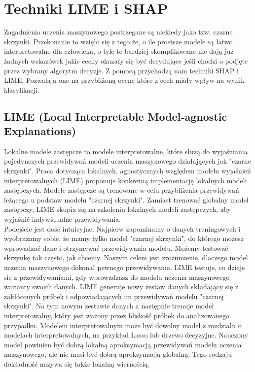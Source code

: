 \section{Techniki LIME i SHAP}
Zagadnienia uczenia maszynowego postrzegane są niekiedy jako tzw. czarne skrzynki. Przekonanie to wzięło się z tego że, o ile prostsze modele są łatwo interpretowalne dla człowieka, o tyle te bardziej skomplikowane nie dają już żadnych wskazówek jakie cechy okazały się być decydujące jeśli chodzi o podjęte przez wybrany algorytm decyzje. Z pomocą przychodzą nam techniki SHAP i LIME. Pozwalaja one na przybliżoną ocenę które z cech miały wpływ na wynik klasyfikacji.\\

\subsection{LIME (Local Interpretable Model-agnostic Explanations)}

Lokalne modele zastępcze to modele interpretowalne, które służą do wyjaśniania pojedynczych przewidywań modeli uczenia maszynowego działających jak "czarne skrzynki". Praca dotycząca lokalnych, agnostycznych względem modelu wyjaśnień interpretowalnych (LIME) proponuje konkretną implementację lokalnych modeli zastępczych. Modele zastępcze są trenowane w celu przybliżenia przewidywań leżącego u podstaw modelu "czarnej skrzynki". Zamiast trenować globalny model zastępczy, LIME skupia się na szkoleniu lokalnych modeli zastępczych, aby wyjaśnić indywidualne przewidywania.\\

Podejście jest dość intuicyjne. Najpierw zapominamy o danych treningowych i wyobrazamy sobie, że mamy tylko model "czarnej skrzynki", do którego możesz wprowadzać dane i otrzymywać przewidywania modelu. Możemy testować skrzynkę tak często, jak chcemy. Naszym celem jest zrozumienie, dlaczego model uczenia maszynowego dokonał pewnego przewidywania. LIME testuje, co dzieje się z przewidywaniami, gdy wprowadzasz do modelu uczenia maszynowego warianty swoich danych. LIME generuje nowy zestaw danych składający się z zakłóconych próbek i odpowiadających im przewidywań modelu "czarnej skrzynki". Na tym nowym zestawie danych a następnie trenuje model interpretowalny, który jest ważony przez bliskość próbek do analizowanego przypadku. Modelem interpretowalnym może być dowolny model z rozdziału o modelach interpretowalnych, na przykład Lasso lub drzewo decyzyjne. Nauczony model powinien być dobrą lokalną aproksymacją przewidywań modelu uczenia maszynowego, ale nie musi być dobrą aproksymacją globalną. Tego rodzaju dokładność nazywa się także lokalną wiernością.\\

